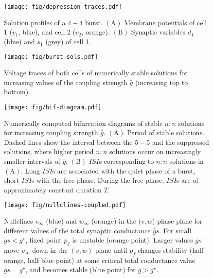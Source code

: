 \documentclass[utf8, draft]{frontiersFPHY} %
\newcommand{\gbar}{\bar g}
\begin{document}
\begin{figure}[h!]
  \centering
  \texttt{[image: fig/depression-traces.pdf]}
  \caption{Solution profiles of a $4-4$ burst. $\bm{\mathrm{(A)}}$ Membrane potentials
    of cell 1 ($v_{1}$, blue), and cell 2 ($v_{2}$, orange). $\bm{\mathrm{(B)}}$
    Synaptic variables $d_{1}$ (blue) and $s_{1}$ (grey) of cell
    1.~\label{fig:depression-traces}}
\end{figure}

\begin{figure}[h!]
  \centering
  \texttt{[image: fig/burst-sols.pdf]}
  \caption{Voltage traces of both cells of numerically stable solutions for increasing
    values of the coupling strength $\gbar$ (increasing top to
    bottom).~\label{fig:burst-sols}}
\end{figure}

\begin{figure}[h!]
  \centering
  \texttt{[image: fig/bif-diagram.pdf]}
  \caption{Numerically computed bifurcation diagrams of stable $n:n$ solutions for
    increasing coupling strength $\gbar$. $\bm{\mathrm{(A)}}$ Period of stable
    solutions. Dashed lines show the interval between the $5-5$ and the suppressed
    solutions, where higher period $n:n$ solutions occur on increasingly smaller intervals
    of $\gbar$. $\bm{\mathrm{(B)}}$ $ISI$s corresponding to $n:n$ solutions in
    $\mathrm{(A)}$. Long $ISI$s are associated with the quiet phase of a burst, short
    $ISI$s with the free phase. During the free phase, $ISI$s are of approximately
    constant duration $T$.\label{fig:bif-diagram}}
\end{figure}

\begin{figure}[h!]
  \centering
  \texttt{[image: fig/nullclines-coupled.pdf]}
  \caption{Nullclines $v_{\infty}$ (blue) and $w_{\infty}$ (orange) in the
  $(v,w$)-phase plane for different values of the total synaptic conductance $\gbar
  s$. For small $\gbar s < g^{\star}$, fixed point $p_{f}$ is unstable (orange
  point). Larger values $\gbar s$ move $v_{\infty}$ down in the $(v,w)$-plane until
  $p_{f}$ changes stability (half orange,  half blue point) at some critical total
  conductance value $\gbar s = g^{\star}$, and becomes stable (blue point) for
  $\gbar>g^{\star}$.~\label{fig:nullclines-coupled}}
\end{figure}
\end{document}
